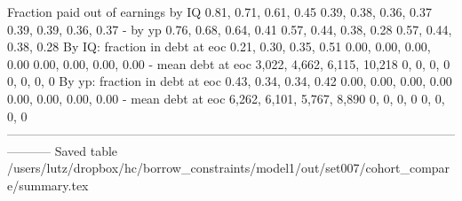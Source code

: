    Fraction paid out of earnings by IQ       0.81, 0.71, 0.61, 0.45    0.39, 0.38, 0.36, 0.37    0.39, 0.39, 0.36, 0.37
                               - by yp       0.76, 0.68, 0.64, 0.41    0.57, 0.44, 0.38, 0.28    0.57, 0.44, 0.38, 0.28
        By IQ: fraction in debt at eoc       0.21, 0.30, 0.35, 0.51    0.00, 0.00, 0.00, 0.00    0.00, 0.00, 0.00, 0.00
                    - mean debt at eoc  3,022, 4,662, 6,115, 10,218                0, 0, 0, 0                0, 0, 0, 0
        By yp: fraction in debt at eoc       0.43, 0.34, 0.34, 0.42    0.00, 0.00, 0.00, 0.00    0.00, 0.00, 0.00, 0.00
                    - mean debt at eoc   6,262, 6,101, 5,767, 8,890                0, 0, 0, 0                0, 0, 0, 0
-----------------------------------------------------------------------------------------------------------------------
Saved table  /users/lutz/dropbox/hc/borrow_constraints/model1/out/set007/cohort_compare/summary.tex 
